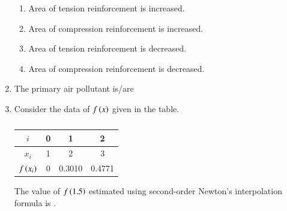 \documentclass[journal,12pt,onecolumn]{article}
\theoremstyle{remark}
\begin{document}
\begin{enumerate}
    \hfill{}
    \begin{enumerate}
        \item Area of tension reinforcement is increased.
        \item Area of compression reinforcement is increased.
        \item Area of tension reinforcement is decreased.
        \item Area of compression reinforcement is decreased.
    \end{enumerate}

    \item The primary air pollutant is/are
    
    \hfill{}
    \begin{enumerate}
    \end{enumerate}

    \item Consider the data of $f\left(x\right)$ given in the table.
    \begin{table}[H]
        \centering
        \begin{tabular}{|c|c|c|c|}
            \hline
            $i$ & 0 & 1 & 2 \\
            \hline
            $x_i$ & 1 & 2 & 3 \\
            \hline
            $f\left(x_i\right)$ & 0 & 0.3010 & 0.4771 \\
            \hline
        \end{tabular}
        \caption{}
        \label{tab:q32}
    \end{table}
    The value of $f\left(1.5\right)$ estimated using second-order Newton's interpolation formula is \underline{\hspace{2cm}} .
    
    \hfill{}


\end{enumerate}
\end{document}
